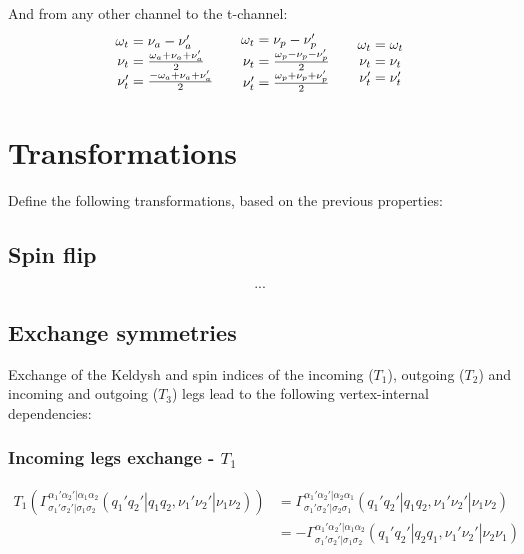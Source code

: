 \documentclass[12pt,a4paper,roman]{article}
\begin{document}
And from any other channel to the t-channel:
\begin{align}
    \begin{array}{r@{\mskip\thickmuskip}l}
    \omega_t &= \nu_a-\nu'_a\\
    \nu_t  &= \frac{ \omega_a+\nu_a+\nu'_a}{2}\\
    \nu'_t &= \frac{-\omega_a+\nu_a+\nu'_a}{2}\\
  \end{array}
  \quad  \begin{array}{r@{\mskip\thickmuskip}l}
    \omega_t &= \nu_p-\nu'_p\\
    \nu_t  &= \frac{\omega_p-\nu_p-\nu'_p}{2}\\
    \nu'_t &= \frac{\omega_p+\nu_p+\nu'_p}{2}\\
  \end{array} \quad
  \begin{array}{r@{\mskip\thickmuskip}l}
    \omega_t &= \omega_t\\
    \nu_t  &= \nu_t \\
    \nu'_t &= \nu'_t\\
  \end{array}
\end{align}





\section*{Transformations}
Define the following transformations, based on the previous properties:
\subsection*{Spin flip}
\begin{equation}
    ...
    \label{eq:ts}
\end{equation}

\subsection*{Exchange symmetries}
Exchange of the Keldysh and spin indices of the incoming ($T_1$), outgoing ($T_2$) and incoming and outgoing ($T_3$) legs lead to the following vertex-internal dependencies:
\subsubsection*{Incoming legs exchange - $T_1$}
\begin{align}
    T_1 \left( \Gamma_{\sigma_1'\sigma_2'|\sigma_1\sigma_2}^{\alpha_1'\alpha_2'|\alpha_1\alpha_2}(q_1'q_2'|q_1q_2, \nu_1'\nu_2'|\nu_1\nu_2) \right) &= \Gamma_{\sigma_1'\sigma_2'|\sigma_2\sigma_1}^{\alpha_1'\alpha_2'|\alpha_2\alpha_1}(q_1'q_2'|q_1q_2, \nu_1'\nu_2'|\nu_1\nu_2)\\
    &= -\Gamma_{\sigma_1'\sigma_2'|\sigma_1\sigma_2}^{\alpha_1'\alpha_2'|\alpha_1\alpha_2}(q_1'q_2'|q_2q_1, \nu_1'\nu_2'|\nu_2\nu_1)
    \label{eq:t1}
\end{align}
\end{document}
